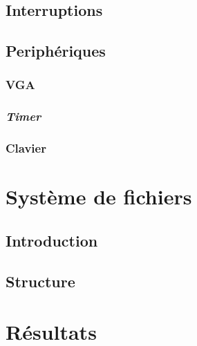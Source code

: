 \documentclass[a4paper]{article}
\begin{document}
\subsection{Interruptions}


\subsection{Periphériques}
\subsubsection{VGA}

\subsubsection{\textit{Timer}}

\subsubsection{Clavier}


\section{Système de fichiers}
\subsection{Introduction}


\subsection{Structure}


\section{Résultats}

\end{document}
